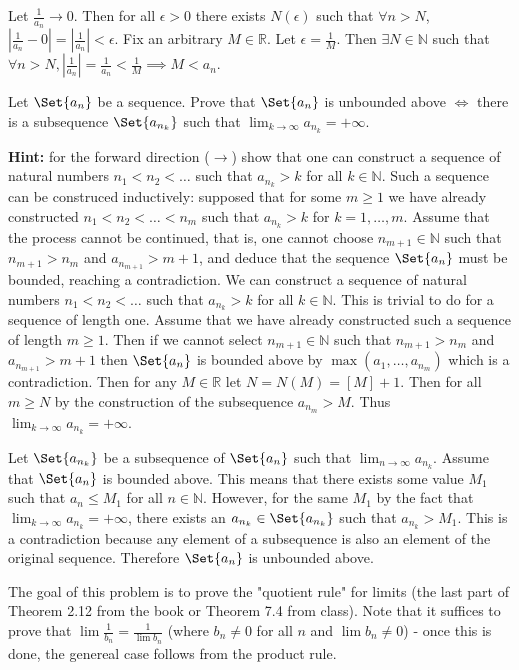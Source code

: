 \documentclass[paper=a4, fontsize=11pt]{jhwhw} %
\begin{document}
Let $\frac{1}{a_n}\to 0$. Then for all $\epsilon > 0$ there exists $N(\epsilon)$ such that $\forall n > N$, $\left|\frac{1}{a_n} - 0\right| = \left|\frac{1}{a_n}\right| < \epsilon $. Fix an arbitrary $M\in \mathbb R$. Let $\epsilon = \frac{1}{M}$. Then $\exists N\in \mathbb N$ such that $\forall n > N, \left|\frac{1}{a_n}\right| = \frac{1}{a_n} < \frac{1}{M} \implies M < a_n$. 

Let $\Set{a_n}$ be a sequence. Prove that $\Set{a_n}$ is unbounded above $\iff$ there is a subsequence $\Set{a_{n_k}}$ such that $\lim_{k\to\infty}a_{n_k} = +\infty$. 

    \textbf{Hint:} for the forward direction ($\to$) show that one can construct a sequence of natural numbers $n_1 < n_2 < \ldots$ such that $a_{n_k} > k$ for all $k\in \mathbb N$. Such a sequence can be construced inductively: supposed that for some $m \ge 1$ we have already constructed $n_1 < n_2 < \ldots < n_m$ such that $a_{n_k} > k$ for $k = 1,\ldots, m$. Assume that the process cannot be continued, that is, one cannot choose $n_{m+1}\in \mathbb N$ such that $n_{m+1} > n_m$ and $a_{n_{m+1}} > m + 1$, and deduce that the sequence $\Set{a_n}$ must be bounded, reaching a contradiction.
\solution
We can construct a sequence of natural numbers $n_1 < n_2 < \ldots$ such that $a_{n_k} > k$ for all $k\in \mathbb N$. This is trivial to do for a sequence of length one. Assume that we have already constructed such a sequence of length $m\ge 1$. Then if we cannot select $n_{m+1} \in \mathbb N$ such that $n_{m+1} > n_m$ and $a_{n_{m+1}} > m + 1$ then $\Set{a_n}$ is bounded above by $\max(a_1, \ldots, a_{n_m})$ which is a contradiction. Then for any $M\in \mathbb R$ let $N = N(M) = [M] + 1$. Then for all $m \ge N$ by the construction of the subsequence $a_{n_m} > M$. Thus $\lim_{k\to\infty}a_{n_k} = +\infty$.

Let $\Set{a_{n_k}}$ be a subsequence of $\Set{a_n}$ such that $\lim_{n\to\infty}a_{n_k}$. Assume that $\Set{a_n}$ is bounded above. This means that there exists some value $M_1$ such that $a_n \le M_1$ for all $n\in \mathbb N$. However, for the same $M_1$ by the fact that $\lim_{k\to\infty}a_{n_k} = +\infty$, there exists an $a_{n_k} \in \Set{a_{n_k}}$ such that $a_{n_k} > M_1$. This is a contradiction because any element of a subsequence is also an element of the original sequence. Therefore $\Set{a_n}$ is unbounded above.

The goal of this problem is to prove the "quotient rule" for limits (the last part of Theorem 2.12 from the book or Theorem 7.4 from class). Note that it suffices to prove that $\lim\frac{1}{b_n} = \frac{1}{\lim b_n}$ (where $b_n \not= 0$ for all $n$ and $\lim b_n \not= 0$) - once this is done, the genereal case follows from the product rule. 
\end{document}
